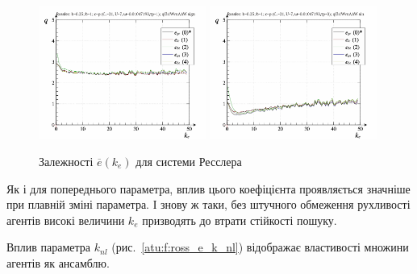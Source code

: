 \begin{figure}[ht!]
\begin{center}
  \includegraphics[width=0.49\textwidth]{p/cha/ross/ross_id-p_k_e_ql3rlWvnAAW_sign.png}
  \hfill
  \includegraphics[width=0.49\textwidth]{p/cha/ross/ross_id-p_k_e_ql3rlWvnAAW_sin.png}
\end{center}
\caption{Залежності $ \overline{e} (k_e) $ для системи Ресслера}
\label{atu:f:ross_e_k_e}
\end{figure}

Як і для попереднього параметра, вплив цього коефіцієнта проявляється
значніше при плавній зміні параметра. І знову ж таки, без
штучного обмеження рухливості агентів високі величини
$k_e$ призводять до втрати стійкості пошуку.

Вплив параметра
$k_{nl}$ (рис.~\ref{atu:f:ross_e_k_nl})
відображає властивості множини агентів як ансамблю.

